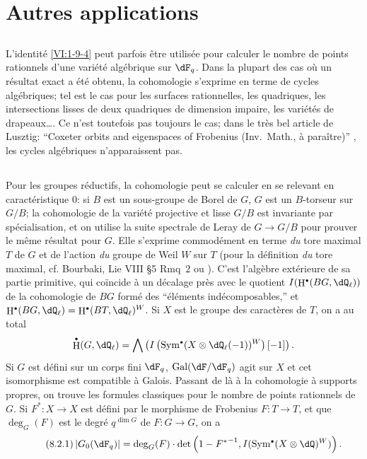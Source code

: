 \documentclass[oneside]{book}
\DeclareMathOperator{\gal}{Gal}
\DeclareMathOperator{\h}{H}
\theoremstyle{sga-source}
\theoremstyle{sga-source-dash}
\theoremstyle{sga-source-dotdash}
\theoremstyle{sga-source-number-note-dash}
\theoremstyle{sga-source-note-number-dotdash}
\theoremstyle{sga-source-example-dotdash}
\theoremstyle{sga-source-inline-number}
\theoremstyle{sga-source-bare-number}
\theoremstyle{sga-source}
\let\oldbullet\bullet
\renewcommand{\bullet}{\textnormal{\tiny$\oldbullet$}}
\newcommand{\PrintPage}[1]{}\newcommand{\MathPage}[1]{}\newcommand{\PrintCite}[2]{#1}\newcommand{\var}[3]{#1}
\begin{document}
\PrintPage{230}
\section{Autres applications}\label{VI:8}





\subsection{}\label{VI:8-1}

L'identité \ref{VI:1-9-4} peut parfois être utilisée pour calculer 
le nombre de points rationnels d'une variété algébrique sur $\dF_q$. Dans 
la plupart des cas où un résultat exact a été obtenu, la cohomologie 
s'exprime en terme de cycles algébriques; tel est le cas pour les surfaces 
rationnelles, les quadriques, les intersections lisses de deux quadriques de 
dimension impaire, les variétés de drapeaux\ldots. Ce n'est toutefois pas 
toujours le cas; dans le très bel article de Lusztig: ``Coxeter orbits and eigenspaces of Frobenius (Inv.~Math., à paraître)'' \cite{lu76}, les cycles 
algébriques n'apparaissent pas. 





\subsection{}\label{VI:8-2}

Pour les groupes réductifs, la cohomologie peut se calculer en se relevant en 
caractéristique $0$: si $B$ est un sous-groupe de Borel de $G$, $G$ est un 
$B$-torseur sur $G/B$; la cohomologie de la variété projective et lisse 
$G/B$ est invariante par spécialisation, et on utilise la suite spectrale de 
Leray de $G\to G/B$ pour prouver le même résultat pour $G$. Elle s'exprime 
commodément en terme \emph{du} tore maximal $T$ de $G$ et de l'action 
\emph{du} \var{groupe de Weil $W$}{groupe de Weyl $W$}{S45-SOL-0978} sur $T$ (pour la définition \emph{du} tore 
maximal, cf. Bourbaki, Lie VIII \S 5 Rmq~2 \cite[VIII \S 5 Rem.2]{bo05} ou \cite[p.105]{dl76}). C'est 
l'algèbre extérieure de sa partie primitive, qui coïncide à un décalage 
près avec le quotient $I(\h^\bullet(B G,\dQ_\ell))$ de la cohomologie de 
$B G$ formé des ``éléments indécomposables,'' et 
$\h^\bullet(B G,\dQ_\ell)=\h^\bullet(B T,\dQ_\ell)^W$. Si $X$ est le groupe des 
caractères de $T$, on a au total 
\[
  \h^\bullet(G,\dQ_\ell) = \bigwedge \left(I\left(\operatorname{Sym}^\bullet(X\otimes \dQ_\ell(-1))^W\right)[-1]\right) \text{.}
\]
Si $G$ est défini sur un corps fini $\dF_q$, $\gal(\dF/\dF_q)$ agit sur $X$ 
et cet isomorphisme est compatible à Galois. Passant de là à la 
cohomologie à supports propres, on trouve les formules classiques pour le 
nombre de points rationnels de $G$. Si $F^\ast:X\to X$ est défini par le 
morphisme de Frobenius $F:T\to T$, et que $\deg_G(F)$ est le degré 
$q^{\dim G}$ de $F:G\to G$, on a 
\begin{equation*}\tag{8.2.1}\label{VI:eq:8-2-1}
  \left|G_0(\dF_q)\right| = \deg_G(F) \cdot \det\left(1-{F^\ast}^{-1},I(\operatorname{Sym}^\bullet(X\otimes \dQ)^W)\right) \text{.}
\end{equation*}
\end{document}
